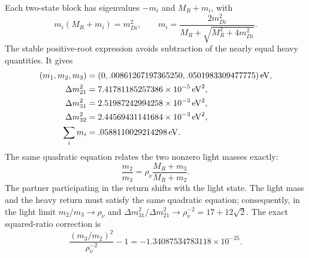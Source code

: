 \documentclass[aps,prx,onecolumn,10pt,notitlepage,nofootinbib,longbibliography]{revtex4-2}
\numberwithin{equation}{section}
\numberwithin{table}{section}
\newcommand{\eV}{\,\mathrm{eV}}
\newcommand{\MR}{M_R}
\begin{document}
Each two-state block has eigenvalues $-m_i$ and $\MR+m_i$, with
\begin{equation}
 m_i(\MR+m_i)=m_{Di}^2,\qquad
 m_i=\frac{2m_{Di}^2}{\MR+\sqrt{\MR^2+4m_{Di}^2}}.
 \label{eq:neutralroots}
\end{equation}
The stable positive-root expression avoids subtraction of the nearly equal heavy quantities. It gives
\begin{align}
 (m_1,m_2,m_3)&=(0,.00861267197365250,.0501983309477775)\eV,\notag\\
 \Delta m_{21}^2&=7.41781185257386\times10^{-5}\,\mathrm{eV}^2,\notag\\
 \Delta m_{31}^2&=2.51987242994258\times10^{-3}\,\mathrm{eV}^2,\notag\\
 \Delta m_{32}^2&=2.44569431141684\times10^{-3}\,\mathrm{eV}^2,\notag\\
 \sum_i m_i&=.0588110029214298\eV.
 \label{eq:neutrinovalues}
\end{align}
The same quadratic equation relates the two nonzero light masses exactly:
\begin{equation}
 \frac{m_2}{m_3}=\rho_\nu\frac{\MR+m_3}{\MR+m_2}.
 \label{eq:neutralratioexact}
\end{equation}
The partner participating in the return shifts with the light state. The light mass and the heavy return must satisfy the same quadratic equation; consequently, in the light limit $m_2/m_3\to\rho_\nu$ and $\Delta m_{31}^2/\Delta m_{21}^2\to\rho_\nu^{-2}=17+12\sqrt2$. The exact squared-ratio correction is
\begin{equation}
 \frac{(m_3/m_2)^2}{\rho_\nu^{-2}}-1=-1.34087534783118\times10^{-25}.
\end{equation}
\end{document}
